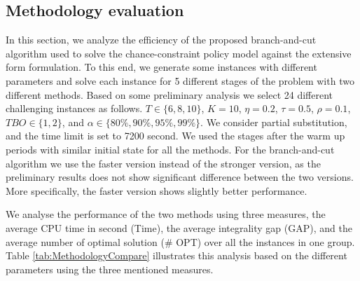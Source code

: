 \documentclass[10pt]{article}
\newcommand{\Ti}{T}
\newcommand{\Ka}{K}
\newcommand{\Bi}{B} %
\newcommand{\Vi}{v} %
\begin{document}
\subsection{Methodology evaluation}
In this section, we analyze the efficiency of the proposed branch-and-cut algorithm used to solve the chance-constraint policy model against the extensive form formulation. To this end, we generate some instances with different parameters and  solve each instance for 5 different stages of the problem with two different methods. Based on some preliminary analysis we select 24 different challenging instances as follows. $\Ti \in \{  6, 8 , 10\}$, $\Ka = 10$,
$\eta =  0.2 $,
$\tau = 0.5 $,
$\rho = 0.1$,
$ TBO \in \{1, 2\} $, and
$ \alpha \in \{80\%, 90\%, 95\%, 99\% \} $. We consider partial substitution, and the time limit is set to 7200 second. We used the stages after the warm up periods with similar initial state for all the methods. For the branch-and-cut algorithm we use the faster version instead of the stronger version, as the preliminary results does not show significant difference between the two versions. More specifically, the faster version shows slightly better performance. 

  
We analyse the performance of the two methods using three measures, the average CPU time in second (Time), the average integrality gap (GAP), and the average number of optimal solution (\# OPT) over all the instances in one group.
Table \ref{tab:MethodologyCompare} illustrates this analysis based on the different parameters using the three mentioned measures. 
\end{document}

